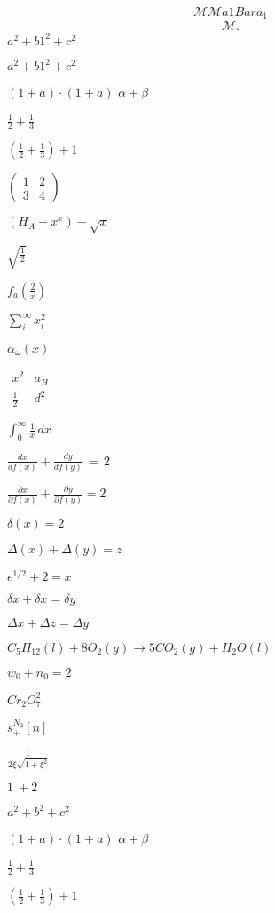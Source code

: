 \documentclass{article}
\begin{document}
\[
  \mathcal{M} 
  \mathcal{M} a1Bar 
  a_{1}
\]
\begin{equation}
\begin{aligned}
  \mathcal{M}
.\end{aligned}
\end{equation}
$a^2 + b1^2 + c^2$

$a^2 + b1^2 + c^2$

$(1 + a) \cdot (1 + a)$
$\alpha + \beta$

$\frac{1}{2} + \frac{1}{3}$


$(\frac{1}{2} + \frac{1}{3}) + 1$


$\begin{pmatrix} 1 & 2 \\ 3 & 4 \end{pmatrix}$

$(H_A+x^x)+\sqrt{x}$

$\sqrt{\frac{1}{2}}$

$f_a(\frac{2}{x})$


$\sum_i^{\infty} x_i^2$


$\alpha_{\omega}(x)$

$\begin{matrix} x^2 & a_H \\ \frac{1}{2} & d^2 \end{matrix}$


$\int_0^{\infty} \frac{1}{x}\, dx$


$\frac{dx}{df(x)} + \frac{dy}{df(y)}\, =\, 2$


$\frac{\partial x}{\partial f(x)} + \frac{\partial y}{\partial f(y)} = 2$


$\delta (x) = 2$

$\Delta (x) + \Delta (y) = z$

$e^{1/2} + 2 = x$

$\delta x + \delta x = \delta y$

$\Delta x + \Delta z = \Delta y$

$C_5H_{12}(l)+8O_2(g)\rightarrow 5CO_2(g)+H_2O(l)$

$w_0 + n_0 = 2$

$Cr_2O_7^2$

$s^{N_2}_+ [n]$

$\frac{1}{2\xi \sqrt{1+\xi^2}}$

$1\: + 2$

$a^2 + b^2 + c^2$

$(1 + a) \cdot (1 + a)$
$\alpha + \beta$

$\frac{1}{2} + \frac{1}{3}$


$(\frac{1}{2} + \frac{1}{3}) + 1$
\end{document}
